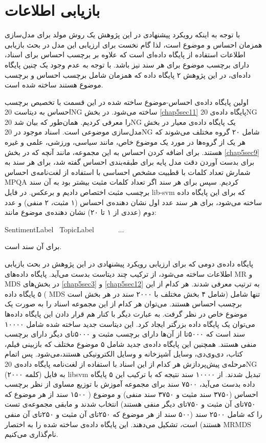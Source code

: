 \section{بازیابی اطلاعات}
\label{chap5sec10}
با توجه به اینکه رویکرد پیشنهادی در  این پژوهش یک روش مولد برای مدل‌سازی همزمان احساس و موضوع است، لذا گام نخست برای ارزیابی این مدل در بحث بازیابی اطلاعات استفاده از پایگاه داده‌ای است که علاوه بر برچسب احساس برای اسناد، دارای برچسب موضوع برای هر سند نیز باشد. با توجه به عدم وجود یک چنین پایگاه داده‌ای، در این پژوهش ۲ پایگاه داده که همزمان شامل برچسب احساس و برچسب موضوع هستند ساخته شده است.

اولین پایگاه داده‌ی احساس‌-موضوع ساخته شده در این قسمت با تخصیص برچسب احساس به دیتاست
20NG
ساخته می‌‌شود. در بخش
\ref{chap5sec11}
پایگاه داده‌ی
20NG
را معرفی‌ کردیم. همان‌طور که بیان شد
20NG
یک پایگاه داده‌ی معیار در بخش مدل‌سازی موضوعی است. اسناد موجود در
20NG
شامل ۲۰ گروه مختلف می‌‌شوند که هر یک از گروه‌ها در مورد یک موضوع خاص، مانند سیاسی، ورزشی، علمی‌ و غیره هستند. برای اضافه کردن احساس به این مجموعه، مانند آنچه که در بخش
\ref{chap5sec9}
برای بدست آوردن دقت مدل پایه برای طبقه‌بندی احساس گفته شد، برای هر سند به شمارش تعداد کلمات با قطبیت مشخص احساسی‌ با استفاده از 
لغت‌نامه‌ی احساس
MPQA
کردیم. سپس برای هر سند اگر تعداد کلمات مثبت بیشتر بود به آن سند برچسب مثبت اختصاص دادیم و برعکس. در فایل
lib-svm
که برای این پایگاه داده ساخته می‌‌شود، برای هر سند عدد اول نشان دهنده‌ی احساس (۱ مثبت، ۲ منفی‌) و عدد دوم (عددی از ۱ تا ۲۰) نشان 
دهند‌ه‌ی موضوع مانند:\\ 
\begin{latin}
	SentimentLabel \ TopicLabel \ <ID:Count> \ <ID:Count> \ <ID:Count> \ ... 
\end{latin} 
برای آن سند است.

پایگاه داده‌ی دومی‌ که برای ارزیابی رویکرد پیشنهادی در این پژوهش در بحث بازیابی اطلاعات ساخته می‌‌شود، از ترکیب چند دیتاست بدست می‌‌آید. 
پایگاه داده‌های
MR
و
MDS
در بخش‌های
\ref{chap5sec3}
و
\ref{chap5sec12}
به ترتیب معرفی‌ شدند. هر کدام از این ۵ پایگاه داده 
(
MDS
 شامل ۴ بخش مختلف با ۲۰۰۰ سند در هر بخش است) 
تنها شامل برچسب احساس هستند. می‌‌توان هر کدام از این مجموعه اسناد را به صورت یک موضوع خاص در نظر گرفت. به عبارت دیگر با کنار هم قرار دادن این پایگاه داده‌ها می‌‌توان یک پایگاه داده بزرگتر ایجاد کرد. این دیتاست جدید ساخته شده شامل ۱۰۰۰۰ سند است که ۵۰۰۰تا از آن‌ها دارای برچسب مثبت و ۵۰۰۰تای دیگر دارای برچسب منفی‌ هستند. همچنین این پایگاه داده‌ی جدید شامل ۵ موضوع مختلف که بازبینی‌ فیلم، کتاب، دی‌وی‌دی، وسایل آشپزخانه و وسایل الکترونیکی‌ هستند،می‌‌شود. پس اتمام مرحله‌ی پیش‌پردازش هر کدام از این اسناد با استفاده از لغت‌نامه پایگاه داد‌ه‌ی
20NG
(۲۰۰۰ کلمه) به فایل
libsvm
تبدیل شدند. از ۱۰۰۰۰ سند نتیجه که با ترکیب این ۵ پایگاه داده بدست می‌‌آید، ۷۵۰۰ سند برای مجموعه آموزش با توزیع مساوی از نظر برچسب احساس (۳۷۵۰ سند مثبت و ۳۷۵۰ سند منفی‌) و موضوع ( ۱۵۰۰ سند از هر موضوع که ۷۵۰تای آن مثبت و ۷۵۰تای دیگر منفی‌ هستند) انتخاب شدند و مابقی 
مجموعه‌ی تست را که شامل ۲۵۰۰ سند (۵۰۰ سند از هر موضوع که ۲۵۰تای آن مثبت و ۲۵۰تای آن منفی‌ هستند) است، تشکیل می‌‌دهند. این پایگاه داده‌ی ساخته شده را به اختصار 
MRMDS
نام‌گذاری می‌کنیم.

